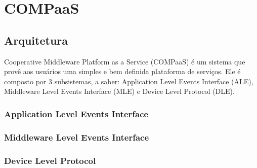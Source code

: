 \section{COMPaaS}
\label{sec:COMPaaS}
\subsection{Arquitetura}
Cooperative Middleware Platform as a Service (COMPaaS) é um sistema que provê aos usuários uma simples e bem definida plataforma de serviços.
Ele é composto por 3 subsistemas, a saber:  Application Level Events Interface (ALE), Middleware Level Events Interface (MLE) e Device Level
Protocol (DLE).
\subsubsection{Application Level Events Interface}
\subsubsection{Middleware Level Events Interface}
\subsubsection{Device Level Protocol}
